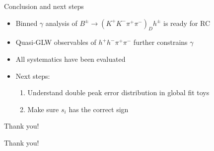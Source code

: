 \documentclass{beamer}
\begin{document}
\begin{frame}{Conclusion and next steps}
  \begin{itemize}
    \setlength\itemsep{2em}
    \item{Binned $\gamma$ analysis of $B^\pm\to(K^+K^-\pi^+\pi^-)_Dh^\pm$ is ready for RC}
    \item{Quasi-GLW observables of $h^+h^-\pi^+\pi^-$ further constrains $\gamma$}
    \item{All systematics have been evaluated}
    \item{Next steps:}
    \begin{enumerate}
      \item{Understand double peak error distribution in global fit toys}
      \item{Make sure $s_i$ has the correct sign}
    \end{enumerate}
  \end{itemize}
\end{frame}

\begin{frame}{Thank you!}
  \begin{center}
    {\huge Thank you!}
  \end{center}
\end{frame}
\end{document}

